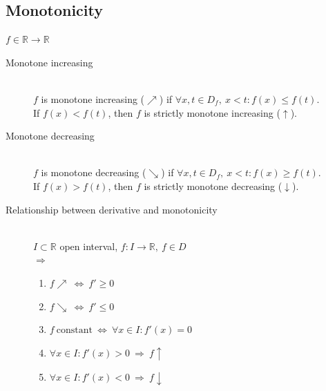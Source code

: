 \documentclass[margin=0px]{article}
\newcommand{\R}{\mathbb{R}}
\begin{document}
\subsection{Monotonicity}
$ f\in \R \rightarrow \R $
\begin{description}
    \item[Monotone increasing] \hfill \\
        $ f $ is monotone increasing ($\nearrow$) if $\forall x,t \in D_f, \ x < t : f(x) \leq f(t) $. \\
        If $  f(x) < f(t) $, then $f$ is strictly monotone increasing ($\uparrow$).
    \item[Monotone decreasing] \hfill \\
        $ f $ is monotone decreasing ($\searrow$) if $\forall x,t \in D_f, \ x < t : f(x) \geq f(t) $. \\
        If $  f(x) > f(t) $, then $f$ is strictly monotone decreasing ($\downarrow$).
    \item[Relationship between derivative and monotonicity] \hfill \\
        $ I \subset \R $ open interval, $ f:I\rightarrow \R, \ f \in D$\\
        $\Rightarrow$
        \begin{enumerate}
            \item $ f \nearrow \ \Leftrightarrow \ f' \geq 0$
            \item $ f \searrow \ \Leftrightarrow \ f' \leq 0$
            \item $ f \ \text{constant} \ \Leftrightarrow \ \forall x \in I : f'(x) = 0$
            \item $ \forall x \in I : f'(x) > 0 \ \Rightarrow  \ f \uparrow $
            \item $ \forall x \in I : f'(x) < 0 \ \Rightarrow  \ f \downarrow $
        \end{enumerate}
\end{description}
\end{document}
